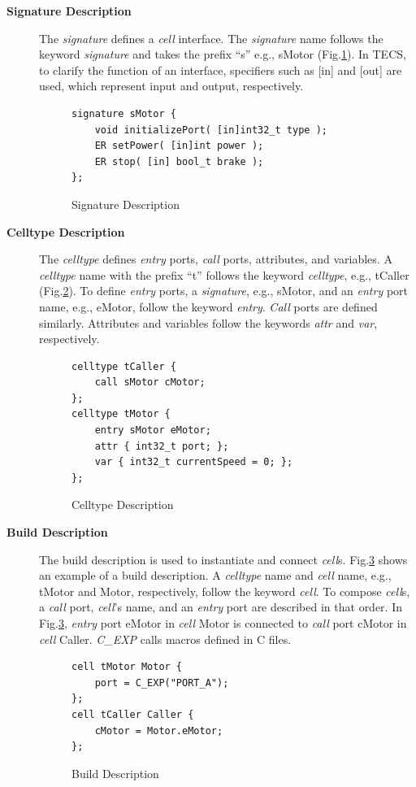 \documentclass[a4j,12pt,oneside,openany,english]{jsbook}
\begin{document}
\begin{description}
    \item[{\bf Signature Description}]
        The {\it signature} defines a {\it cell} interface.
        The {\it signature} name follows the keyword {\it signature} and takes the prefix ``s'' e.g., sMotor (Fig.\ref{signature}).
        In TECS, to clarify the function of an interface, specifiers such as [in] and [out] are used, which represent input and output, respectively.
\begin{figure}[t]
\centering
\begin{lstlisting}
signature sMotor {
    void initializePort( [in]int32_t type );
    ER setPower( [in]int power );
    ER stop( [in] bool_t brake );
};
\end{lstlisting}
\caption{Signature Description}
\label{signature}
\end{figure}
    \item[{\bf Celltype Description}]
        The {\it celltype} defines {\it entry} ports, {\it call} ports, attributes, and variables.
        A {\it celltype} name with the prefix ``t'' follows the keyword {\it celltype}, e.g., tCaller (Fig.\ref{celltype}).
        To define {\it entry} ports, a {\it signature}, e.g., sMotor, and an {\it entry} port name, e.g., eMotor, follow the keyword {\it entry}.
        {\it Call} ports are defined similarly.
        Attributes and variables follow the keywords {\it attr} and {\it var}, respectively.
\begin{figure}[t]
\centering
\begin{lstlisting}
celltype tCaller {
    call sMotor cMotor;
};
celltype tMotor {
    entry sMotor eMotor;
    attr { int32_t port; };
    var { int32_t currentSpeed = 0; };
};
\end{lstlisting}
\caption{Celltype Description}
\label{celltype}
\end{figure}
    \item[{\bf Build Description}]
        The build description is used to instantiate and connect {\it cell}s.
        Fig.\ref{build} shows an example of a build description.
        A {\it celltype} name and {\it cell} name, e.g., tMotor and Motor, respectively, follow the keyword {\it cell}.
        To compose {\it cell}s, a {\it call} port, {\it cell}'s name, and an {\it entry} port are described in that order.
        In Fig.\ref{build}, {\it entry} port eMotor in {\it cell} Motor is connected to {\it call} port cMotor in {\it cell} Caller.
        {\it C\_EXP} calls macros defined in C files.

\begin{figure}[t]
\centering
\begin{lstlisting}
cell tMotor Motor {
    port = C_EXP("PORT_A");
};
cell tCaller Caller {
    cMotor = Motor.eMotor;
};
\end{lstlisting}
\caption{Build Description}
\label{build}
\end{figure}

\end{description}
\end{document}
